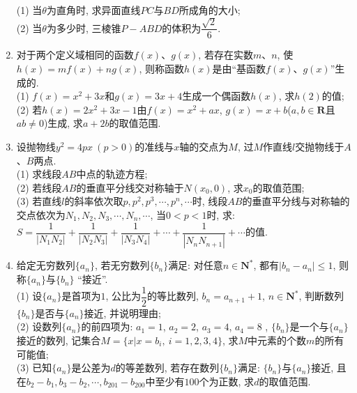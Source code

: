 \documentclass[10pt,a4paper]{article}
\begin{document}
\begin{enumerate}[1.]
\begin{center}
\end{center}
(1) 当$\theta$为直角时, 求异面直线$PC$与$BD$所成角的大小;\\
(2) 当$\theta$为多少时, 三棱锥$P-ABD$的体积为$\dfrac{\sqrt 2}6$.
\item 对于两个定义域相同的函数$f(x)$、$g(x)$, 若存在实数$m$、$n$, 使$h(x)=mf(x)+ng(x)$, 则称函数$h(x)$是由``基函数$f(x)$、$g(x)$''生成的.\\
(1) $f(x)=x^2+3x$和$g(x)=3x+4$生成一个偶函数$h(x)$, 求$h(2)$的值;\\
(2) 若$h(x)=2x^2+3x-1$由$f(x)=x^2+ax$, $g(x)=x+b$($a,b\in \mathbf{R}$且$ab\ne 0$)生成, 求$a+2b$的取值范围.
\item 设抛物线$y^2=4px\ (p>0)$的准线与$x$轴的交点为$M$, 过$M$作直线$l$交抛物线于$A$、$B$两点.\\
(1) 求线段$AB$中点的轨迹方程;\\
(2) 若线段$AB$的垂直平分线交对称轴于$N(x_0,0)$, 求$x_0$的取值范围;\\
(3) 若直线$l$的斜率依次取$p, p^2,p^3,\cdots ,p^n,\cdots$时, 线段$AB$的垂直平分线与对称轴的交点依次为$N_1, N_2, N_3,\cdots ,N_n, \cdots$, 当$0<p<1$时, 求: $S=\dfrac 1{|N_1N_2|}+\dfrac 1{|N_2N_3|}+\dfrac 1{|N_3N_4|}+\cdots +\dfrac 1{|N_nN_{n+1}|}+\cdots$的值.
\item 给定无穷数列$\{a_n\}$, 若无穷数列$\{b_n\}$满足: 对任意$n\in \mathbf{N}^*$, 都有$|b_n-a_n|\le 1$, 则称$\{a_n\}$与$\{b_n\}$ ``接近''.\\
(1) 设$\{a_n\}$是首项为$1$, 公比为$\dfrac 12$的等比数列, $b_n=a_{n+1}+1$, $n\in \mathbf{N}^*$, 判断数列$\{b_n\}$是否与$\{a_n\}$接近, 并说明理由;\\
(2) 设数列$\{a_n\}$的前四项为: $a_1=1$, $a_2=2$, $a_3=4$, $a_4=8$ , $\{b_n\}$是一个与$\{a_n\}$接近的数列, 记集合$M=\{x|x=b_i,\ i=1,2,3,4\}$, 求$M$中元素的个数$m$的所有可能值;\\
(3) 已知$\{a_n\}$是公差为$d$的等差数列, 若存在数列$\{b_n\}$满足: $\{b_n\}$与$\{a_n\}$接近, 且在$b_2-b_1,b_3-b_2,\cdots,b_{201}-b_{200}$中至少有$100$个为正数, 求$d$的取值范围.


\end{enumerate}
\end{document}
